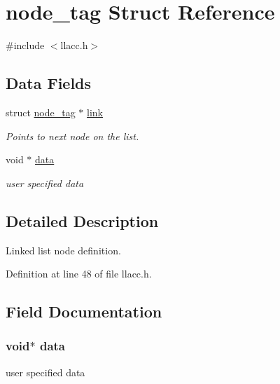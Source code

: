 \hypertarget{structnode__tag}{\section{node\-\_\-tag Struct Reference}
\label{structnode__tag}
}


{\ttfamily \#include $<$llacc.\-h$>$}

\subsection*{Data Fields}
\begin{DoxyCompactItemize}
\item 
struct \hyperlink{structnode__tag}{node\-\_\-tag} $\ast$ \hyperlink{structnode__tag_a0177d8b8e657780d13898a315db2c5ab}{link}
\begin{DoxyCompactList}\small\item\em Points to next node on the list. \end{DoxyCompactList}\item 
void $\ast$ \hyperlink{structnode__tag_a735984d41155bc1032e09bece8f8d66d}{data}
\begin{DoxyCompactList}\small\item\em user specified data \end{DoxyCompactList}\end{DoxyCompactItemize}


\subsection{Detailed Description}
Linked list node definition. 

Definition at line 48 of file llacc.\-h.



\subsection{Field Documentation}
\hypertarget{structnode__tag_a735984d41155bc1032e09bece8f8d66d}{
\subsubsection[{data}]{\setlength{\rightskip}{0pt plus 5cm}void$\ast$ data}}\label{structnode__tag_a735984d41155bc1032e09bece8f8d66d}


user specified data 



